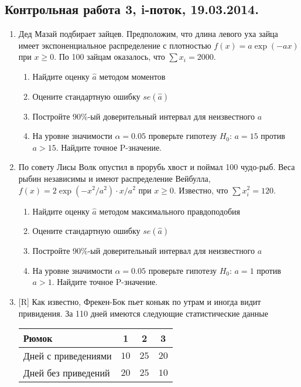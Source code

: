 \subsection{Контрольная работа 3, i-поток, 19.03.2014. }

\begin{enumerate}
\item Дед Мазай подбирает зайцев. Предположим, что длина левого уха зайца имеет экспоненциальное распределение с плотностью $f(x)=a\exp(-ax)$ при $x\geq 0$. По 100 зайцам оказалось, что $\sum x_i=2000$.
\begin{enumerate}
\item  Найдите оценку $\hat{a}$ методом моментов
\item Оцените стандартную ошибку $se(\hat{a})$
\item Постройте 90\%-ый доверительный интервал для неизвестного $a$
\item На уровне значимости $\alpha=0.05$ проверьте гипотезу $H_0$: $a=15$ против $a>15$. Найдите точное P-значение.
\end{enumerate}

\item По совету Лисы Волк опустил в прорубь хвост и поймал 100 чудо-рыб. Веса рыбин независимы и имеют распределение Вейбулла, $f(x)=2\exp(-x^2/a^2)\cdot x/a^2$ при $x\geq 0$. Известно, что $\sum x_i^2=120$.
\begin{enumerate}
\item  Найдите оценку $\hat{a}$ методом максимального правдоподобия
\item Оцените стандартную ошибку $se(\hat{a})$
\item Постройте 90\%-ый доверительный интервал для неизвестного $a$
\item На уровне значимости $\alpha=0.05$ проверьте гипотезу $H_0$: $a=1$ против $a>1$. Найдите точное P-значение.
\end{enumerate}


\item $[$R] Как известно, Фрекен-Бок пьет коньяк по утрам и иногда видит привидения. За 110 дней имеются следующие статистические данные

\begin{tabular}{@{}lccc@{}}
\toprule
Рюмок               & 1    & 2    & 3    \\ \midrule
Дней с приведениями & $10$ & $25$ & $20$ \\
Дней без приведений & $20$ & $25$ & $10$ \\ \bottomrule
\end{tabular}



\end{enumerate}
